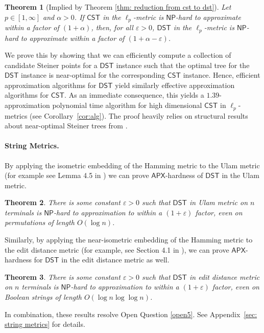 \documentclass{article}\providecommand{\DeclareRedundantLanguages}[2]{}\usepackage[a4paper,margin=20mm]{geometry}
\newtheorem{theorem}{Theorem}\newtheorem{lemma}[theorem]{Lemma}\newtheorem{proposition}[theorem]{Proposition}\newtheorem{corollary}[theorem]{Corollary}\newtheorem{definition}[theorem]{Definition}\newtheorem{claim}[theorem]{Claim}\newtheorem{remark}[theorem]{Remark}\newtheorem{observation}[theorem]{Observation}\newtheorem{conjecture}[theorem]{Conjecture}\newtheorem{example}[theorem]{Example}
\newcommand{\1}{\textbf{1}}
\newcommand{\cst}{$\mathsf{CST}$\xspace}
\newcommand{\dst}{$\mathsf{DST}$\xspace}
\newcommand{\np}{$\mathsf{NP}$\xspace}
\newcommand{\apx}{$\mathsf{APX}$\xspace}
\begin{document}
\begin{theorem}[Implied by Theorem \ref{thm: reduction from cst to dst}]\label{thm:csttodstintro}
Let $p \in [1,\infty]$ and $\alpha>0$. If \cst in the $\ell_p$-metric is \np-hard to approximate within a factor of $(1 + \alpha)$, then, for all $\varepsilon > 0$, \dst in the $\ell_p$-metric is \np-hard to approximate within a factor of $(1 + \alpha - \varepsilon)$.
\end{theorem}

We prove this by showing that we can efficiently compute  a collection of candidate Steiner points for a \dst instance such that the optimal tree for the \dst instance is near-optimal for the corresponding \cst instance. Hence, efficient approximation algorithms for \dst yield similarly effective approximation algorithms for \cst. As an immediate consequence, this yields a $1.39$-approximation polynomial time algorithm for high dimensional \cst in $\ell_p$-metrics (see Corollary~\ref{cor:alg}). The proof heavily relies on structural results about near-optimal Steiner trees from \cite{DuZhangFeng91, Borchers97, Bartal_Gottlieb_2021}. 

 \paragraph{String Metrics.} By applying the isometric embedding of the 
Hamming metric to the Ulam metric (for example see Lemma 4.5 in \cite{DBLP:journals/corr/abs-2112-03222}) we can prove \apx-hardness of \dst in the Ulam metric. 
\begin{theorem} \label{thm: ulam hardness}
There is some constant $\varepsilon > 0$ such that \dst in Ulam metric on $n$ terminals is \np-hard to approximation to within a $(1+\varepsilon)$ factor, even on permutations of length $O(\log n)$. 
\end{theorem}
Similarly, by applying the near-isometric embedding of the Hamming metric to the edit distance metric (for example, see Section 4.1 in \cite{DBLP:conf/stoc/Rubinstein18}), we can prove \apx-hardness for \dst in the edit distance metric  as well. 
\begin{theorem} \label{thm: edit hardness}
There is some constant $\varepsilon > 0$ such that \dst in edit distance metric on $n$ terminals is \np-hard to approximation to within a $(1+\varepsilon)$ factor, even on Boolean strings of length $O(\log n \log \log n)$. 
\end{theorem}
In combination, these results resolve Open Question \ref{open5}. See Appendix~\ref{sec: string metrics} for details.
\end{document}
